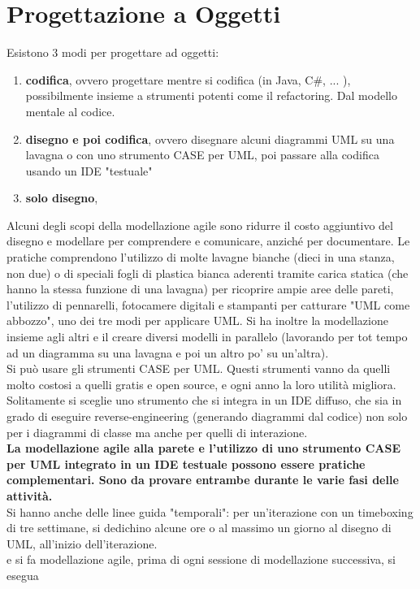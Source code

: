 \documentclass[a4paper,12pt, oneside]{book}
\begin{document}
\chapter{Progettazione a Oggetti}
Esistono 3 modi per progettare ad oggetti:
\begin{enumerate}
	\item \textbf{codifica}, ovvero progettare mentre si codifica (in Java, C\#, ... ), possibilmente insieme a strumenti potenti come il refactoring. Dal modello mentale al codice.
	\item \textbf{disegno e poi codifica}, ovvero disegnare alcuni diagrammi UML su una lavagna o con uno strumento CASE per UML, poi passare alla codifica usando un IDE "testuale"
	\item \textbf{solo disegno}, 
\end{enumerate}
Alcuni degli scopi della modellazione agile sono ridurre il costo aggiuntivo del disegno e modellare per comprendere e comunicare, anziché per documentare. Le pratiche comprendono l'utilizzo di molte lavagne bianche (dieci in una stanza, non due) o di speciali fogli di plastica bianca
aderenti tramite carica statica (che hanno la stessa funzione di una lavagna) per ricoprire ampie aree delle pareti, l'utilizzo di pennarelli, fotocamere digitali e stampanti per catturare "UML come abbozzo", uno dei tre modi per applicare UML. Si ha inoltre la modellazione insieme agli altri e il creare diversi modelli in parallelo (lavorando per tot tempo ad un diagramma su una lavagna e poi un altro po' su un'altra).\\
Si può usare gli strumenti CASE per UML. Questi strumenti vanno da quelli molto costosi a quelli gratis e open
source, e ogni anno la loro utilità migliora. Solitamente si sceglie uno strumento che si integra in un IDE diffuso, che sia in grado di eseguire reverse-engineering (generando diagrammi dal codice) non solo per i diagrammi di classe ma anche per quelli di interazione.\\
\textbf{La modellazione agile alla parete e l'utilizzo di uno strumento CASE per UML integrato in un IDE testuale possono essere pratiche complementari. Sono da provare entrambe durante le varie fasi delle attività.}\\
Si hanno anche delle linee guida "temporali": per un'iterazione con un timeboxing di tre settimane, si dedichino alcune ore o al massimo un giorno al disegno di UML, all'inizio dell'iterazione.\\
e si fa modellazione agile, prima di ogni sessione di modellazione successiva, si esegua
\end{document}

